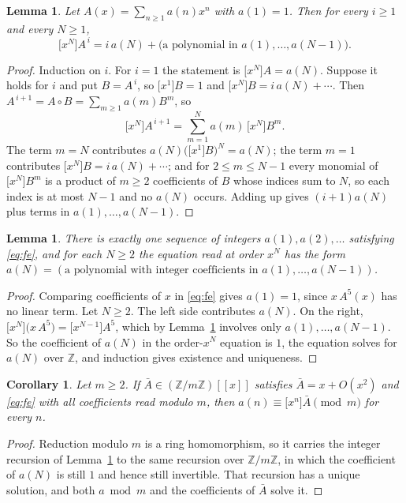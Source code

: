 \documentclass[11pt,a4paper]{article}
\theoremstyle{plain}
\newtheorem{lemma}[theorem]{Lemma}
\newtheorem{corollary}[theorem]{Corollary}
\theoremstyle{definition}
\begin{document}
\begin{lemma}\label{lem:jaN}
Let $A(x)=\sum_{n\ge1}a(n)x^{n}$ with $a(1)=1$. Then for every $i\ge1$ and every $N\ge1$,
\[
\bigl[x^{N}\bigr]A^{\,i}=i\,a(N)+\bigl(\text{a polynomial in }a(1),\dots,a(N-1)\bigr).
\]
\end{lemma}

\begin{proof}
Induction on $i$. For $i=1$ the statement is $\bigl[x^{N}\bigr]A=a(N)$. Suppose it holds
for $i$ and put $B=A^{\,i}$, so $\bigl[x^{1}\bigr]B=1$ and
$\bigl[x^{N}\bigr]B=i\,a(N)+\cdots$. Then
$A^{\,i+1}=A\circ B=\sum_{m\ge1}a(m)B^{m}$, so
\[
\bigl[x^{N}\bigr]A^{\,i+1}=\sum_{m=1}^{N}a(m)\,\bigl[x^{N}\bigr]B^{m} .
\]
The term $m=N$ contributes $a(N)\bigl(\bigl[x^{1}\bigr]B\bigr)^{N}=a(N)$; the term $m=1$
contributes $\bigl[x^{N}\bigr]B=i\,a(N)+\cdots$; and for $2\le m\le N-1$ every monomial of
$\bigl[x^{N}\bigr]B^{m}$ is a product of $m\ge2$ coefficients of $B$ whose indices sum to
$N$, so each index is at most $N-1$ and no $a(N)$ occurs. Adding up gives $(i+1)a(N)$ plus
terms in $a(1),\dots,a(N-1)$.
\end{proof}

\begin{lemma}\label{lem:unique}
There is exactly one sequence of integers $a(1),a(2),\dots$ satisfying \eqref{eq:fe}, and
for each $N\ge2$ the equation read at order $x^{N}$ has the form
$a(N)=(\text{a polynomial with integer coefficients in }a(1),\dots,a(N-1))$.
\end{lemma}

\begin{proof}
Comparing coefficients of $x$ in \eqref{eq:fe} gives $a(1)=1$, since $x\,A^{5}(x)$ has
no linear term. Let $N\ge2$. The left side contributes $a(N)$. On the right,
$\bigl[x^{N}\bigr]\bigl(x\,A^{5}\bigr)=\bigl[x^{N-1}\bigr]A^{5}$, which by
Lemma~\ref{lem:jaN} involves only $a(1),\dots,a(N-1)$. So the coefficient of $a(N)$ in the
order-$x^{N}$ equation is $1$, the equation solves for $a(N)$ over $\mathbb{Z}$, and
induction gives existence and uniqueness.
\end{proof}

\begin{corollary}\label{cor:mod}
Let $m\ge2$. If $\bar A\in(\mathbb{Z}/m\mathbb{Z})[[x]]$ satisfies $\bar A=x+O(x^{2})$ and
\eqref{eq:fe} with all coefficients read modulo $m$, then
$a(n)\equiv\bigl[x^{n}\bigr]\bar A\pmod m$ for every $n$.
\end{corollary}

\begin{proof}
Reduction modulo $m$ is a ring homomorphism, so it carries the integer recursion of
Lemma~\ref{lem:unique} to the same recursion over $\mathbb{Z}/m\mathbb{Z}$, in which the
coefficient of $a(N)$ is still $1$ and hence still invertible. That recursion has a unique
solution, and both $a\bmod m$ and the coefficients of $\bar A$ solve it.
\end{proof}
\end{document}

